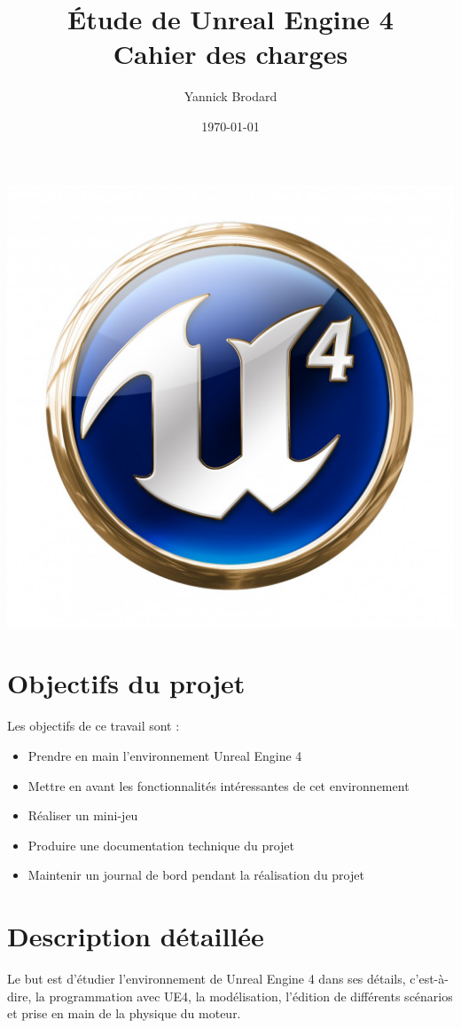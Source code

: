 \documentclass[11pt, a4paper]{article}
\title{
\Huge{Étude de Unreal Engine 4} \\[0.5cm]
\LARGE{Cahier des charges}
}
\author{Yannick Brodard}
\date{\today}
\begin{document}
\maketitle
\begin{center}
    \includegraphics[scale=0.4]{UE4_logo}
\end{center}
\thispagestyle{empty}
\newpage
\section{Objectifs du projet}
Les objectifs de ce travail sont :
\begin{itemize}
\item Prendre en main l'environnement Unreal Engine 4
\item Mettre en avant les fonctionnalités intéressantes de cet environnement
\item Réaliser un mini-jeu
\item Produire une documentation technique du projet
\item Maintenir un journal de bord pendant la réalisation du projet
\end{itemize}
\section{Description détaillée}
Le but est d'étudier l'environnement de Unreal Engine 4 dans ses détails, c'est-à-dire, la programmation avec UE4, la modélisation, l'édition de différents scénarios et prise en main de la physique du moteur.
\end{document}
